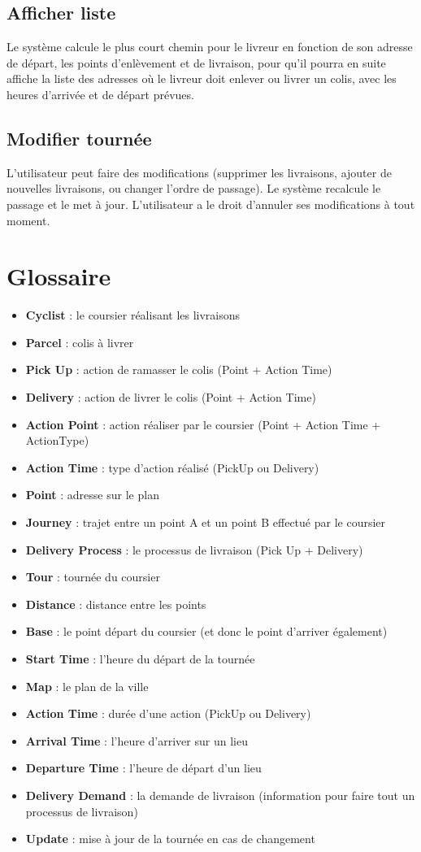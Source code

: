 \documentclass{scrartcl}
\begin{document}
\subsection{Afficher liste}
Le système calcule le plus court chemin pour le livreur en fonction de son adresse de départ, les points d’enlèvement et de livraison, pour qu'il pourra en suite affiche la liste des adresses où le livreur doit enlever ou livrer un colis, avec les heures d'arrivée et de départ prévues.
\subsection{Modifier tournée}
L'utilisateur peut faire des modifications (supprimer les livraisons, ajouter de nouvelles livraisons, ou changer l'ordre de passage). Le système recalcule le passage et le met à jour. L'utilisateur a le droit d'annuler ses modifications à tout moment.

\section{Glossaire}

\begin{itemize}
\item \textbf{Cyclist} : le coursier réalisant les livraisons
\item \textbf{Parcel} : colis à livrer
\item \textbf{Pick Up }: action de ramasser le colis (Point + Action Time)
\item \textbf{Delivery} : action de livrer le colis (Point + Action Time)
\item \textbf{Action Point} : action réaliser par le coursier (Point + Action Time + ActionType)
\item \textbf{Action Time} : type d'action réalisé (PickUp ou Delivery)
\item \textbf{Point} : adresse sur le plan
\item \textbf{Journey} : trajet entre un point A et un point B effectué par le coursier
\item \textbf{Delivery Process }: le processus de livraison (Pick Up + Delivery)
\item \textbf{Tour} : tournée du coursier
\item \textbf{Distance} : distance entre les points
\item \textbf{Base} : le point départ du coursier (et donc le point d'arriver également)
\item \textbf{Start Time} : l'heure du départ de la tournée
\item \textbf{Map} : le plan de la ville
\item \textbf{Action Time }: durée d'une action (PickUp ou Delivery)
\item \textbf{Arrival Time }: l'heure d'arriver sur un lieu
\item \textbf{Departure Time} : l'heure de départ d'un lieu
\item \textbf{Delivery Demand} : la demande de livraison (information pour faire tout un processus de livraison)
\item \textbf{Update }: mise à jour de la tournée en cas de changement

\end{itemize}
\end{document}
